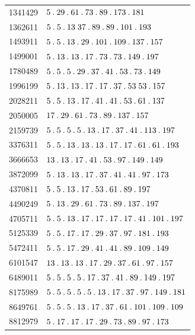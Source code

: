 \begin{longtable}{@{}r|l@{}}
1341429 & $5\pdot 29\pdot 61\pdot 73\pdot 89\pdot 173\pdot 181$\\
1362611 & $5\pdot 5\pdot 13\;37\pdot 89\pdot 89\pdot 101\pdot 193$\\
1493911 & $5\pdot 5\pdot 13\pdot 29\pdot 101\pdot 109\pdot 137\pdot 157$\\
1499001 & $5\pdot 13\pdot 13\pdot 17\pdot 73\pdot 73\pdot 149\pdot 197$\\
1780489 & $5\pdot 5\pdot 5\pdot 29\pdot 37\pdot 41\pdot 53\pdot 73\pdot 149$\\
1996199 & $5\pdot 13\pdot 13\pdot 17\pdot 17\pdot 37\pdot 53\;53\pdot 157$\\
2028211 & $5\pdot 5\pdot 13\pdot 17\pdot 41\pdot 41\pdot 53\pdot 61\pdot 137$\\
2050005 & $17\pdot 29\pdot 61\pdot 73\pdot 89\pdot 137\pdot 157$\\
2159739 & $5\pdot 5\pdot 5\pdot 5\pdot 13\pdot 17\pdot 37\pdot 41\pdot 113\pdot 197$\\
3376311 & $5\pdot 5\pdot 13\pdot 13\pdot 13\pdot 17\pdot 17\pdot 61\pdot 61\pdot 193$\\
3666653 & $13\pdot 13\pdot 17\pdot 41\pdot 53\pdot 97\pdot 149\pdot 149$\\
3872099 & $5\pdot 13\pdot 13\pdot 17\pdot 37\pdot 41\pdot 41\pdot 97\pdot 173$\\
4370811 & $5\pdot 5\pdot 13\pdot 17\pdot 53\pdot 61\pdot 89\pdot 197$\\
4490249 & $5\pdot 13\pdot 29\pdot 61\pdot 73\pdot 89\pdot 137\pdot 197$\\
4705711 & $5\pdot 5\pdot 13\pdot 17\pdot 17\pdot 17\pdot 17\pdot 41\pdot 101\pdot 197$\\
5125339 & $5\pdot 5\pdot 17\pdot 17\pdot 29\pdot 37\pdot 97\pdot 181\pdot 193$\\
5472411 & $5\pdot 5\pdot 17\pdot 29\pdot 41\pdot 41\pdot 89\pdot 109\pdot 149$\\
6101547 & $13\pdot 13\pdot 13\pdot 17\pdot 29\pdot 37\pdot 61\pdot 97\pdot 157$\\
6489011 & $5\pdot 5\pdot 5\pdot 5\pdot 17\pdot 37\pdot 41\pdot 89\pdot 149\pdot 197$\\
8175989 & $5\pdot 5\pdot 5\pdot 5\pdot 5\pdot 13\pdot 17\pdot 37\pdot 97\pdot 149\pdot 181$\\
8649761 & $5\pdot 5\pdot 5\pdot 13\pdot 17\pdot 37\pdot 61\pdot 101\pdot 109\pdot 109$\\
8812979 & $5\pdot 17\pdot 17\pdot 17\pdot 29\pdot 73\pdot 89\pdot 97\pdot 173$\\

\end{longtable}
